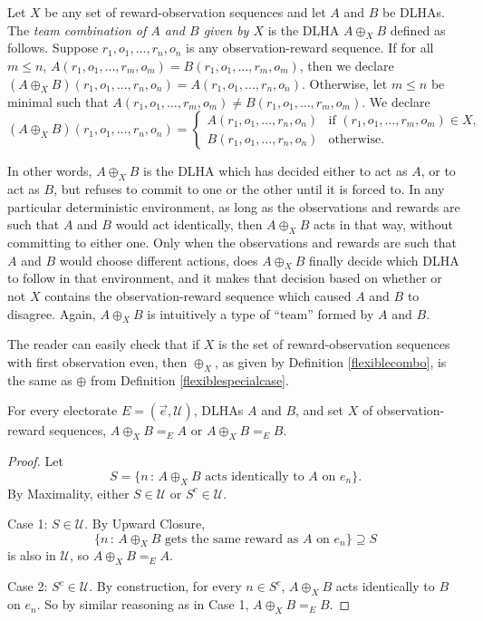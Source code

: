 \documentclass[twoside,11pt]{article}
\begin{document}
\begin{definition}
\label{flexiblecombo}
    Let $X$ be any set of reward-observation sequences and let $A$ and $B$ be DLHAs.
    The \emph{team combination of $A$ and $B$ given by $X$} is the DLHA
    $A\oplus_X B$ defined as follows.
    Suppose $r_1,o_1,\ldots,r_n,o_n$ is any observation-reward sequence.
    If for all $m\leq n$, $A(r_1,o_1,\ldots,r_m,o_m)=B(r_1,o_1,\ldots,r_m,o_m)$,
    then we declare $(A\oplus_X B)(r_1,o_1,\ldots,r_n,o_n)=A(r_1,o_1,\ldots,r_n,o_n)$.
    Otherwise, let $m\leq n$ be minimal such that
    $A(r_1,o_1,\ldots,r_m,o_m)\neq B(r_1,o_1,\ldots,r_m,o_m)$.
    We declare
    \[
        (A\oplus_X B)(r_1,o_1,\ldots,r_n,o_n) =
        \begin{cases}
            A(r_1,o_1,\ldots,r_n,o_n) & \mbox{if $(r_1,o_1,\ldots,r_m,o_m)\in X$},\\
            B(r_1,o_1,\ldots,r_n,o_n) & \mbox{otherwise}.
        \end{cases}
    \]
\end{definition}

In other words, $A\oplus_X B$ is the DLHA which has decided either to act as $A$,
or to act as $B$, but refuses to commit to one or the other until it is forced to.
In any particular deterministic environment, as long as the observations and
rewards are such that
$A$ and $B$ would act identically, then $A\oplus_X B$ acts in that way, without
committing to either one. Only when the observations and rewards are such that $A$
and $B$ would choose different actions, does $A\oplus_X B$ finally decide which DLHA
to follow in that environment, and it makes that decision based on whether or not
$X$ contains the observation-reward sequence which caused $A$ and $B$ to disagree.
Again, $A\oplus_X B$ is intuitively a type of ``team'' formed by $A$ and $B$.

The reader can easily check that if $X$ is the set of reward-observation sequences
with first
observation even, then $\oplus_X$, as given by Definition \ref{flexiblecombo},
is the same as $\oplus$ from Definition \ref{flexiblespecialcase}.

\begin{proposition}
\label{splittingproposition}
    For every electorate $E=(\vec{e},\mathscr U)$, DLHAs $A$ and $B$, and set $X$ of
    observation-reward sequences,
    $A\oplus_X B =_{E} A$ or $A\oplus_X B =_{E}B$.
\end{proposition}

\begin{proof}
    Let
    \[
        S = \{n\,:\,\mbox{$A\oplus_X B$ acts identically to $A$ on $e_n$}\}.
    \]
    By Maximality, either $S\in\mathscr U$ or $S^c\in\mathscr U$.

    Case 1: $S\in\mathscr U$.
    By Upward Closure,
    \[
        \{n\,:\,\mbox{$A\oplus_X B$ gets the same reward as $A$ on $e_n$}\}
        \supseteq
        S
    \]
    is also in $\mathscr U$, so $A\oplus_X B =_{E} A$.

    Case 2: $S^c\in\mathscr U$.
    By construction, for every $n\in S^c$, $A\oplus_X B$ acts identically to $B$ on $e_n$.
    So by similar reasoning as in Case 1, $A\oplus_X B =_{E} B$.
\end{proof}
\end{document}
